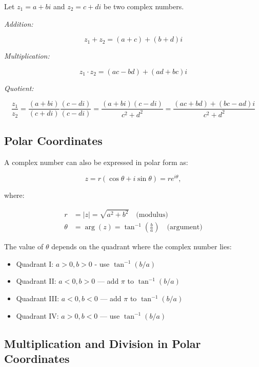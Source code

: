 Let \( z_1 = a + bi \) and \( z_2 = c + di \) be two complex numbers.
\vspace{\baselineskip}

\emph{Addition:}

\[ 
	z_1 + z_2 = (a + c) + (b + d)i
\]

\emph{Multiplication:}
	      
\[
	z_1 \cdot z_2 = (ac - bd) + (ad + bc)i
\]

\emph{Quotient:}
	      
\[
	\frac{z_1}{z_2} = \frac{(a + bi)}{(c + di)} \frac{(c - di)}{(c - di)} = \frac{(a + bi)(c - di)}
	{c^2 + d^2} = \frac{(ac + bd) + (bc - ad)i}{c^2 + d^2}
\]

\subsection{Polar Coordinates}

A complex number can also be expressed in polar form as:

\[
	z = r(\cos \theta + i \sin \theta) = re^{i\theta},
\]

where:

\begin{align*}
	r      & = |z| = \sqrt{a^2 + b^2} \quad \text{(modulus)}                       \\
	\theta & = \arg(z) = \tan^{-1}\left(\frac{b}{a}\right) \quad \text{(argument)}
\end{align*}

The value of \( \theta \) depends on the quadrant where the complex number lies:

\begin{itemize}
	
	\item Quadrant I: \( a > 0, b > 0 \) - use \( \tan^{-1}(b/a) \)
	
	\item Quadrant II: \( a < 0, b > 0 \) — add \( \pi \) to \( \tan^{-1}(b/a) \)
	
	\item Quadrant III: \( a < 0, b < 0 \) — add \( \pi \) to \( \tan^{-1}(b/a) \)
	
	\item Quadrant IV: \( a > 0, b < 0 \) — use \( \tan^{-1}(b/a) \)

\end{itemize}

\subsection{Multiplication and Division in Polar Coordinates}

